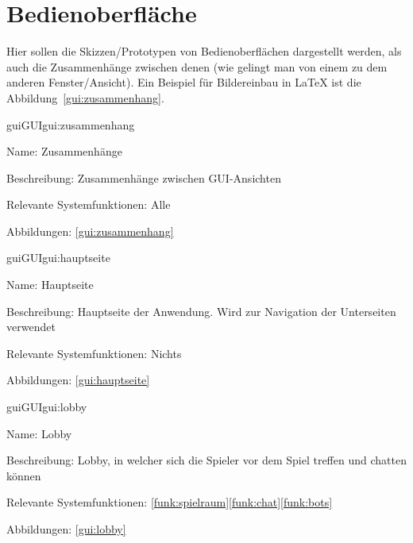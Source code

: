 
\section{Bedienoberfläche}

Hier sollen die Skizzen/Prototypen von Bedienoberflächen dargestellt werden, als auch die Zusammenhänge zwischen denen (wie gelingt man von einem zu dem anderen Fenster/Ansicht). Ein Beispiel für Bildereinbau in LaTeX ist die Abbildung~\ref{gui:zusammenhang}.

\setcounter{gui}{10}

\begin{description}[leftmargin=5em, style=sameline]	
	\begin{lhp}{gui}{GUI}{gui:zusammenhang}
		\item[Name:] Zusammenhänge
		\item[Beschreibung:] Zusammenhänge zwischen GUI-Ansichten
		\item[Relevante Systemfunktionen:] Alle
		\item[Abbildungen:] \ref{gui:zusammenhang}
	\end{lhp}
\end{description}

\begin{description}[leftmargin=5em, style=sameline]	
	\begin{lhp}{gui}{GUI}{gui:hauptseite}
		\item[Name:] Hauptseite
		\item[Beschreibung:] Hauptseite der Anwendung. Wird zur Navigation der Unterseiten verwendet
		\item[Relevante Systemfunktionen:] Nichts
		\item[Abbildungen:] \ref{gui:hauptseite}
	\end{lhp}
\end{description}

\begin{description}[leftmargin=5em, style=sameline]	
	\begin{lhp}{gui}{GUI}{gui:lobby}
		\item[Name:] Lobby
		\item[Beschreibung:] Lobby, in welcher sich die Spieler vor dem Spiel treffen und chatten können
		\item[Relevante Systemfunktionen:] \ref{funk:spielraum}\ref{funk:chat}\ref{funk:bots}
		\item[Abbildungen:] \ref{gui:lobby}
	\end{lhp}
\end{description}

